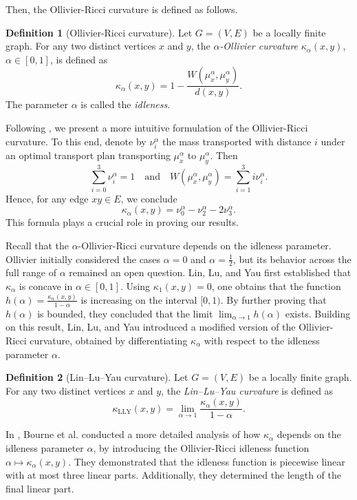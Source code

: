 \documentclass[11pt,bezier]{article}
\theoremstyle{definition}
\newtheorem{defi}{Definition}[section]
\theoremstyle{definition}
\theoremstyle{nonumber}
\begin{document}
Then, the Ollivier-Ricci curvature is defined as follows.

\begin{defi}[Ollivier-Ricci curvature]
Let $G = (V, E)$ be a locally finite graph. For any two distinct vertices $x$ and $y$, the \textit{$\alpha$-Ollivier curvature} $\kappa_\alpha(x, y)$, $\alpha \in [0, 1]$, is defined as
$$
\kappa_\alpha(x, y) = 1 - \frac{W(\mu_x^\alpha, \mu_y^\alpha)}{d(x, y)}.
$$
The parameter $\alpha$ is called the \textit{idleness}.
\end{defi}

Following \cite{Eidi}, we present a more intuitive formulation of the Ollivier-Ricci curvature. To this end, denote by $\nu_i^\alpha$ the mass transported with distance $i$ under an optimal transport plan transporting $\mu_x^\alpha$ to $\mu_y^\alpha$. Then
$$
\sum_{i=0}^{3} \nu_i^\alpha = 1 \quad \text{and} \quad W(\mu_x^\alpha, \mu_y^\alpha) = \sum_{i=1}^{3} i \nu_i^\alpha.
$$
Hence, for any edge $xy\in E$, we conclude
$$\kappa_\alpha(x, y) = \nu_0^\alpha - \nu_2^\alpha - 2 \nu_3^\alpha.$$
This formula plays a crucial role in proving our results.

Recall that the $\alpha$-Ollivier-Ricci curvature depends on the idleness parameter. Ollivier initially considered the cases $\alpha = 0$ and $\alpha = \frac{1}{2}$, but its behavior across the full range of $\alpha$ remained an open question. Lin, Lu, and Yau \cite{LLY} first established that $\kappa_\alpha$ is concave in $\alpha \in [0, 1]$. Using $\kappa_1(x, y) = 0$, one obtains that the function $h(\alpha) = \frac{\kappa_\alpha(x, y)}{1-\alpha}$ is increasing on the interval $[0, 1)$. By further proving that $h(\alpha)$ is bounded, they concluded that the limit $\lim_{\alpha \to 1} h(\alpha)$ exists. Building on this result, Lin, Lu, and Yau introduced a modified version of the Ollivier-Ricci curvature, obtained by differentiating $\kappa_\alpha$ with respect to the idleness parameter $\alpha$.


\begin{defi}[Lin--Lu--Yau curvature]
Let $G = (V, E)$ be a locally finite graph. For any two distinct vertices $x$ and $y$, the \textit{Lin--Lu--Yau curvature} is defined as
$$
\kappa_{\mathrm{LLY}}(x, y) = \lim_{\alpha \to 1} \frac{\kappa_\alpha(x, y)}{1-\alpha}.
$$
\end{defi}

In \cite{Bourne}, Bourne et al. conducted a more detailed analysis of how $\kappa_\alpha$ depends on the idleness parameter $\alpha$, by introducing the Ollivier-Ricci idleness function $\alpha \mapsto \kappa_\alpha(x, y)$. They demonstrated that the idleness function is piecewise linear with at most three linear parts. Additionally, they determined the length of the final linear part.
\end{document}
